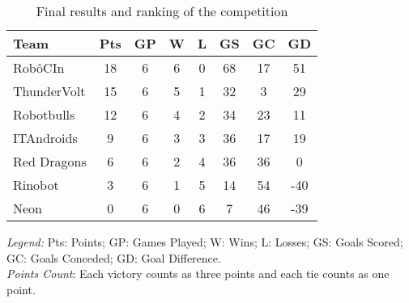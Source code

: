 \begin{table}[h]
    \begin{minipage}{\columnwidth}
        \begin{center}
            \begin{tabular}{l c c c c c c c}
                \toprule
                Team        & Pts & GP & W & L & GS & GC & GD  \\
                \midrule
                RobôCIn     & 18  & 6  & 6 & 0 & 68 & 17 &  51 \\
                ThunderVolt & 15  & 6  & 5 & 1 & 32 &  3 &  29 \\
                Robotbulls  & 12  & 6  & 4 & 2 & 34 & 23 &  11 \\
                ITAndroids  &  9  & 6  & 3 & 3 & 36 & 17 &  19 \\
                Red Dragons &  6  & 6  & 2 & 4 & 36 & 36 &   0 \\
                Rinobot     &  3  & 6  & 1 & 5 & 14 & 54 & -40 \\
                Neon        &  0  & 6  & 0 & 6 &  7 & 46 & -39 \\
                \bottomrule
            \end{tabular}
        \end{center}
        \begin{center}
            \footnotesize 
            \emph{Legend:} Pts: Points; GP: Games Played; W: Wins; L: Losses; GS: Goals Scored; \\GC: Goals Conceded; GD: Goal Difference.\\   
            \emph{Points Count}: Each victory counts as three points and each tie counts as one point.
        \end{center}
    \end{minipage}
    \caption{Final results and ranking of the competition \cite{ResultsIRONCup2023}}
    \label{tab:ironcup_results}
\end{table}
